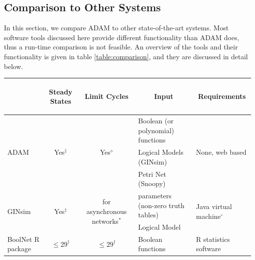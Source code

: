 \documentclass[10pt]{bmc_article}
\newenvironment{bmcformat}{\begin{raggedright}\baselineskip20pt\sloppy\setboolean{publ}{false}}{\end{raggedright}\baselineskip20pt\sloppy}
\begin{document}
\begin{bmcformat}
\subsection*{Comparison to Other Systems}
In this section, we compare ADAM to other state-of-the-art systems.
Most software tools discussed here provide different functionality than ADAM does, thus 
a run-time comparison is not feasible. An overview of the
tools and their functionality is given in table \ref{table:comparison}, and they are discussed in detail below.


\begin{table}
	\begin{tabular}{|l|c|c|l|l|}
		\hline
	
		& \begin{sideways} Steady States \end{sideways} 
			& \begin{sideways} Limit Cycles \end{sideways} 
				& \multicolumn{1}{|c|}{\begin{sideways} Input\end{sideways}}
			& \multicolumn{1}{|c|}{\begin{sideways} Requirements\end{sideways}}  \\
		\hline
			\hline
	
		\multirow{3}{*}{ADAM} & \multirow{3}{*}{Yes$^\ddagger$}& \multirow{3}{*}{Yes$^\diamond$} & Boolean (or polynomial) functions &\multirow{3}{*}{None, web based} \\
			&&&Logical Models (GINsim) &\\
			&&&Petri Net (Snoopy) &\\
		\hline

		\multirow{2}{*}{GINsim}& \multirow{2}{*}{Yes$^\ddagger$} &
    \multirow{2}{*}{for asynchronous networks$^*$ }& parameters (non-zero truth tables) & \multirow{2}{*}{Java virtual machine$^\circ$}\\
			&&&Logical Model &\\
		\hline

		BoolNet R package & $\leq 29^ \dagger$  & $\leq 29^ \dagger$ & Boolean functions & R statistics software\\
		\hline


\end{tabular}
\end{table}
\end{bmcformat}
\end{document}
